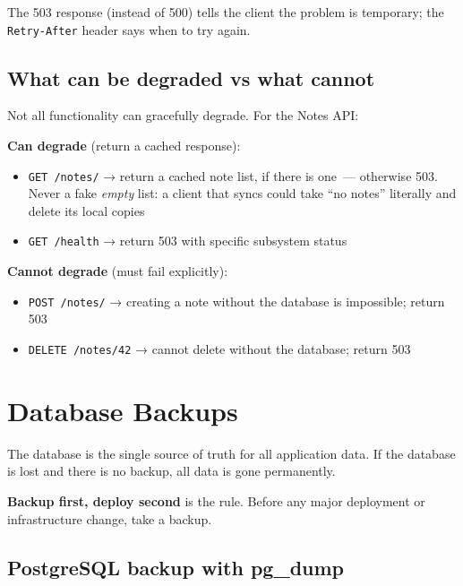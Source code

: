 \noindent{}The 503 response (instead of 500) tells the client the problem is temporary; the \texttt{Retry-After} header says when to try again.

\subsection*{What can be degraded vs what cannot}\label{37-reliability:what-can-be-degraded-vs-what-cannot}

Not all functionality can gracefully degrade. For the Notes API:

\textbf{Can degrade} (return a cached response):

\begin{itemize}
\tightlist
\item
  \texttt{GET\ /notes/} → return a cached note list, if there is one~--- otherwise 503. Never a fake \emph{empty} list: a client that syncs could take ``no notes'' literally and delete its local copies
\item
  \texttt{GET\ /health} → return 503 with specific subsystem status
\end{itemize}

\noindent{}\textbf{Cannot degrade} (must fail explicitly):

\begin{itemize}
\tightlist
\item
  \texttt{POST\ /notes/} → creating a note without the database is impossible; return 503
\item
  \texttt{DELETE\ /notes/42} → cannot delete without the database; return 503
\end{itemize}

\setcounter{section}{3}
\section{Database Backups}\label{37-reliability:374-database-backups}

The database is the single source of truth for all application data. If the database is lost and there is no backup, all data is gone permanently.

\textbf{Backup first, deploy second} is the rule. Before any major deployment or infrastructure change, take a backup.

\subsection*{PostgreSQL backup with pg\_dump}\label{37-reliability:postgresql-backup-with-pg-dump}

